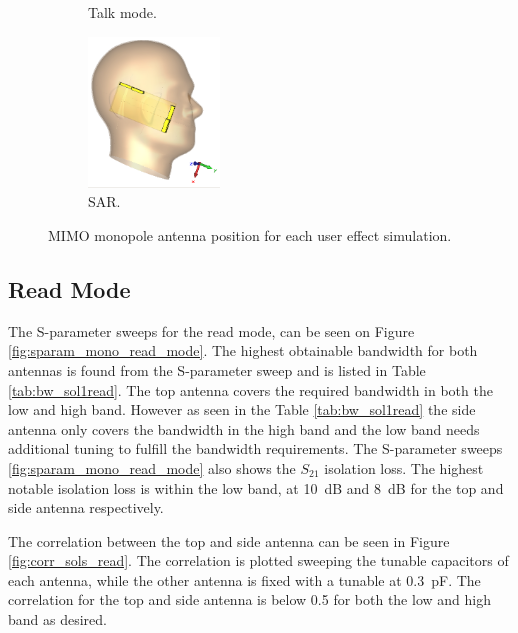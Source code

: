 \begin{figure}[htbp]
\begin{subfigure}[b]{0.24\linewidth}
        \caption{Talk mode.}
    \end{subfigure}
    \begin{subfigure}[b]{0.24\linewidth}
        \centering \includegraphics[width=\linewidth,height=4cm,keepaspectratio]{img/tech_sol/monopole/sar/3d_sar.PNG}
        \caption{SAR.}
    \end{subfigure}
    \caption{MIMO monopole antenna position for each user effect simulation.}
    \label{fig:sol1_monoant_positions}
\end{figure}

\FloatBarrier
\subsection{Read Mode}
The S-parameter sweeps for the read mode, can be seen on Figure \ref{fig:sparam_mono_read_mode}. The highest obtainable bandwidth for both antennas is found from the S-parameter sweep and is listed in Table \ref{tab:bw_sol1read}. The top antenna covers the required bandwidth in both the low and high band. However as seen in the Table \ref{tab:bw_sol1read} the side antenna only covers the bandwidth in the high band and the low band needs additional tuning to fulfill the bandwidth requirements. The S-parameter sweeps \ref{fig:sparam_mono_read_mode} also shows the $S_{21}$ isolation loss. The highest notable isolation loss is within the low band, at \SI{10}{dB} and \SI{8}{dB} for the top and side antenna respectively.       

The correlation between the top and side antenna can be seen in Figure \ref{fig:corr_sols_read}. The correlation is plotted sweeping the tunable capacitors of each antenna, while the other antenna is fixed with a tunable at \SI{0.3}{pF}. The correlation for the top and side antenna is below 0.5 for both the low and high band as desired.

